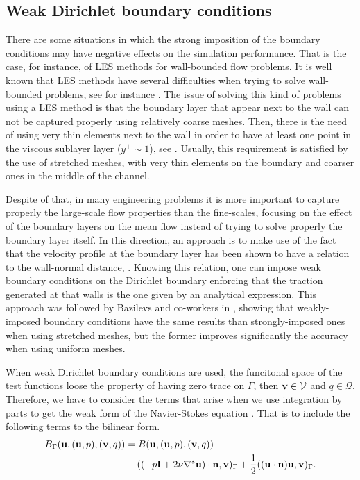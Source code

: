 \subsection{Weak Dirichlet boundary conditions}
\label{subsec-C7_weak_bcs}
There are some situations in which the strong imposition of the boundary conditions may have negative effects on the simulation performance. That is the case, for instance, of LES methods for wall-bounded flow problems. It is well known that LES methods have several difficulties when trying to solve wall-bounded problems, see for instance \cite{spalart_strategies_2000,spalart1997comments}. The issue of solving this kind of problems using a LES method is that the boundary layer that appear next to the wall can not be captured properly using relatively coarse meshes. Then, there is the need of using very thin elements next to the wall in order to have at least one point in the viscous sublayer layer ($ y^+\sim1 $), see \cite{pope_turbulent_2000}. Usually, this requirement is satisfied by the use of stretched meshes, with very thin elements on the boundary and coarser ones in the middle of the channel.

Despite of that, in many engineering problems it is more important to capture properly the large-scale flow properties than the fine-scales, focusing on the effect of the boundary layers on the mean flow instead of trying to solve properly the boundary layer itself. In this direction, an approach is to make use of the fact that the velocity profile at the boundary layer has been shown to have a relation to the wall-normal distance, \cite{pope_turbulent_2000}. Knowing this relation, one can impose weak boundary conditions on the Dirichlet boundary enforcing that the traction generated at that walls is the one given by an analytical expression. This approach was followed by Bazilevs and co-workers in \cite{bazilevs_weak_2007}, showing that weakly-imposed boundary conditions have the same results than strongly-imposed ones when using stretched meshes, but the former improves significantly the accuracy when using uniform meshes. 

When weak Dirichlet boundary conditions are used, the funcitonal space of the test functions loose the property of having zero trace on $\Gamma$, then ${\bf v}\in\mathcal{V}$ and $q\in\mathcal{Q}$. Therefore, we have to consider the terms that arise when we use integration by parts to get the weak form of the Navier-Stokes equation . That is to include the following terms to the bilinear form.
\begin{align}
\label{eq-C7_bilinear_boundary}
B_\Gamma({\bf u},({\bf u},p),({\bf v},q))&=B({\bf u},({\bf u},p),({\bf v},q))\\\nonumber
&-((-p\mathbf{I}+2\nu\nabla^s{\bf u})\cdot{\bf n},{\bf v})_\Gamma+\frac{1}{2}(({\bf u}\cdot{\bf n}){\bf u},{\bf v})_\Gamma.
\end{align}

